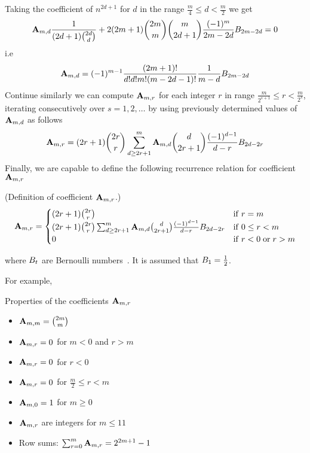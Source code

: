 Taking the coefficient of $n^{2d+1}$ for $d$ in the range $\frac{m}{4} \leq d < \frac{m}{2}$ we get
\begin{align*}
    {\mathbf{A}} \sb{m,d} \frac{1}{(2d+1) \binom{2d}{d}}
    +2 (2m+1) \binom{2m}{m}\binom{m}{2d+1} \frac{(-1)^m}{2m-2d} {B}\sb{2m-2d} = 0
\end{align*}
i.e
\begin{equation*}
    {\mathbf{A}} \sb{m,d} = (-1)^{m-1} \frac{(2m+1)!}{d!d!m!(m-2d-1)!} \frac{1}{m-d} {B}\sb{2m-2d}
\end{equation*}
Continue similarly we can compute ${\mathbf{A}} \sb{m,r}$ for each integer $r$ in range $\frac{m}{2^{s+1}} \leq r < \frac{m}{2^{s}}$,
iterating consecutively over $s=1,2,\ldots$ by using previously determined values of ${\mathbf{A}} \sb{m,d}$ as follows
\begin{equation*}
    {\mathbf{A}} \sb{m,r} =
    (2r+1) \binom{2r}{r} \sum_{d \geq 2r+1}^{m} {\mathbf{A}} \sb{m,d} \binom{d}{2r+1} \frac{(-1)^{d-1}}{d-r}
    {B}\sb{2d-2r}
\end{equation*}
Finally, we are capable to define the following recurrence relation for coefficient ${\mathbf{A}} \sb{m,r}$
\begin{definition} (Definition of coefficient ${\mathbf{A}} \sb{m,r}$.)
    \begin{equation}
        \label{eq:definition_coefficient_a}
        {\mathbf{A}} \sb{m,r} =
        \begin{cases}
        (2r+1)
            \binom{2r}{r} & \mathrm{if} \; r=m \\
            (2r+1) \binom{2r}{r} \sum_{d \geq 2r+1}^{m} {\mathbf{A}} \sb{m,d} \binom{d}{2r+1} \frac{(-1)^{d-1}}{d-r}
            {B}\sb{2d-2r} & \mathrm{if} \; 0 \leq r<m \\
            0 & \mathrm{if} \; r<0 \; \mathrm{or} \; r>m
        \end{cases}
    \end{equation}
\end{definition}
where ${B}\sb{t}$ are Bernoulli numbers~\cite{bateman1953higher}.
It is assumed that ${B}\sb{1}=\frac{1}{2}$.

For example,


Properties of the coefficients ${\mathbf{A}} \sb{m,r}$
\begin{itemize}
    \item ${\mathbf{A}} \sb{m,m} = \binom{2m}{m}$
    \item ${\mathbf{A}} \sb{m,r} = 0$ for $m < 0$ and $r > m$
    \item ${\mathbf{A}} \sb{m,r} = 0$ for $r < 0$
    \item ${\mathbf{A}} \sb{m,r} = 0$ for $\frac{m}{2} \leq r < m$
    \item ${\mathbf{A}} \sb{m,0} = 1$ for $m \geq 0$
    \item ${\mathbf{A}} \sb{m,r}$ are integers for $m \leq 11$
    \item Row sums: $\sum_{r=0}^{m} {\mathbf{A}} \sb{m,r} = 2^{2m+1} - 1$
\end{itemize}

